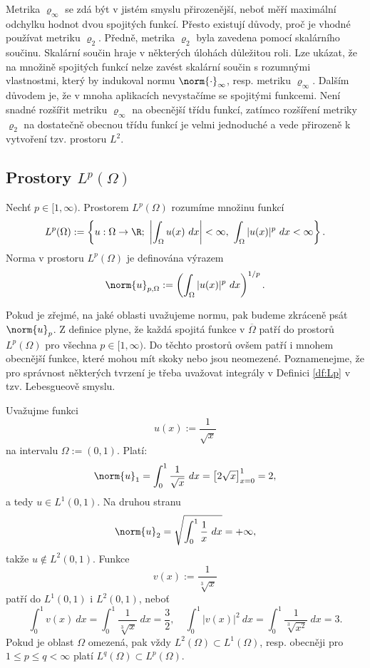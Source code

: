Metrika $\varrho_\infty$ se zdá být v jistém smyslu přirozenější, neboť měří maximální odchylku hodnot dvou spojitých funkcí.
Přesto existují důvody, proč je vhodné používat metriku $\varrho_2$.
Předně, metrika $\varrho_2$ byla zavedena pomocí skalárního součinu. Skalární součin hraje v některých úlohách důležitou roli.
Lze ukázat, že na množině spojitých funkcí nelze zavést skalární součin s rozumnými vlastnostmi, který by indukoval normu $\norm{\cdot}_\infty$, resp. metriku $\varrho_\infty$.
Dalším důvodem je, že v mnoha aplikacích nevystačíme se spojitými funkcemi. Není snadné rozšířit metriku $\varrho_\infty$ na obecnější třídu funkcí, zatímco rozšíření metriky $\varrho_2$ na dostatečně obecnou třídu funkcí je velmi jednoduché a vede přirozeně k vytvoření tzv. prostoru $L^2$.


\subsection{Prostory $L^p(\Omega)$}

\begin{df}
\label{df:Lp}
Nechť $p\in[1,\infty)$. Prostorem $L^p(\Omega)$ rozumíme množinu funkcí
\[ L^p(\Omega):=\left\{u:\Omega\to\R;~\left|\int_\Omega u(x)~dx\right|<\infty,~\int_\Omega |u(x)|^p~dx<\infty \right\}. \]
Norma v prostoru $L^p(\Omega)$ je definována výrazem
\[ \norm{u}_{p,\Omega}:=\left(\int_\Omega|u(x)|^p~dx\right)^{1/p}. \]
\end{df}

Pokud je zřejmé, na jaké oblasti uvažujeme normu, pak budeme zkráceně psát $\norm{u}_p$.
Z definice plyne, že každá spojitá funkce v $\overline\Omega$ patří do prostorů $L^p(\Omega)$ pro všechna $p\in[1,\infty)$.
Do těchto prostorů ovšem patří i mnohem obecnější funkce, které mohou mít skoky nebo jsou neomezené.
Poznamenejme, že pro správnost některých tvrzení je třeba uvažovat integrály v Definici \ref{df:Lp} v tzv. Lebesgueově smyslu.

\begin{ex}
Uvažujme funkci
\[ u(x) := \frac1{\sqrt{x}} \]
na intervalu $\Omega:=(0,1)$.
Platí:
\[ \norm{u}_1 = \int_0^1 \frac1{\sqrt{x}}~dx = \left[2\sqrt{x}\right]_{x=0}^1 = 2, \]
a tedy $u\in L^1(0,1)$. Na druhou stranu
\[ \norm{u}_2 = \sqrt{\int_0^1 \frac1x~dx} = +\infty, \]
takže $u\notin L^2(0,1)$.
Funkce
\[ v(x) := \frac1{\sqrt[3]{x}} \]
patří do $L^1(0,1)$ i $L^2(0,1)$, neboť
\[ \int_0^1 v(x)~dx = \int_0^1 \frac1{\sqrt[3]{x}}~dx = \frac32,\quad \int_0^1 |v(x)|^2~dx = \int_0^1 \frac1{\sqrt[3]{x^2}}~dx = 3. \]
Pokud je oblast $\Omega$ omezená, pak vždy $L^2(\Omega)\subset L^1(\Omega)$, resp. obecněji pro $1\le p\le q<\infty$ platí $L^q(\Omega)\subset L^p(\Omega)$.
\end{ex}

